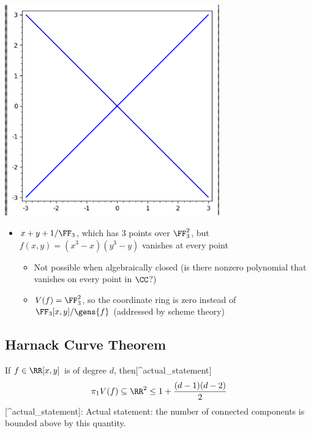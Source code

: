 \begin{example}
\includegraphics[width=3.64583in,height=\textheight]{figures/image_2020-08-21-01-23-32.png}

\begin{itemize}
\item
  \(x+y+1/\FF_3\), which has 3 points over \(\FF_3^2\), but
  \(f(x, y) = (x^3 - x)(y^3-y)\) vanishes at every point

  \begin{itemize}
  \item
    Not possible when algebraically closed (is there nonzero polynomial
    that vanishes on every point in \(\CC\)?)
  \item
    \(V(f) = \FF_3^2\), so the coordinate ring is zero instead of
    \(\FF_3[x, y]/\gens{f}\) (addressed by scheme theory)
  \end{itemize}
\end{itemize}

\end{example}

\hypertarget{harnack-curve-theorem}{%
\subsection{Harnack Curve Theorem}\label{harnack-curve-theorem}}

\begin{theorem}

If \(f \in \RR[x, y]\) is of degree \(d\),
then{[}\^{}actual\_statement{]}
\begin{align*}  
\pi_1 V(f) \subseteq \RR^2 \leq 1 + {(d-1)(d-2) \over 2}
\end{align*} {[}\^{}actual\_statement{]}: Actual statement: the number
of connected components is bounded above by this quantity.

\end{theorem}

